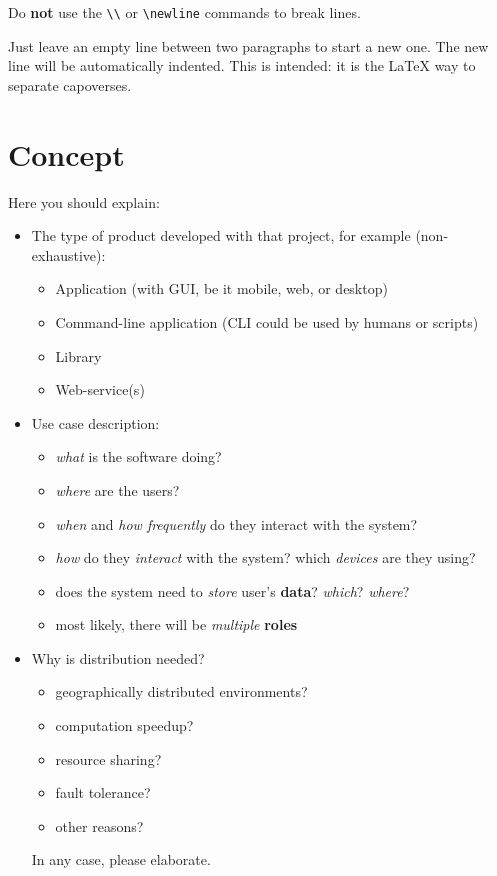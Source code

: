 \documentclass{scrartcl}
\newenvironment{guideline}[1][gray]{\color{#1}}{}
\begin{document}
Do \textbf{not} use the \texttt{\textbackslash\textbackslash} or \texttt{\textbackslash newline} commands to break lines.

Just leave an empty line between two paragraphs to start a new one.
%
The new line will be automatically indented.
%
This is intended: it is the \LaTeX{} way to separate capoverses.

\section{Concept}\label{concept}

\begin{guideline}
Here you should explain:

\begin{itemize}
  \item The type of product developed with that project, for example (non-exhaustive):
  \begin{itemize}
    \item Application (with GUI, be it mobile, web, or desktop)
    \item Command-line application (CLI could be used by humans or scripts)
    \item Library
    \item Web-service(s)
  \end{itemize}

  \item Use case description:
  \begin{itemize}
    \item \emph{what} is the software doing?
    \item \emph{where} are the users?
    \item \emph{when} and \emph{how frequently} do they interact with the system?
    \item \emph{how} do they \emph{interact} with the system? which \emph{devices} are they using?
    \item does the system need to \emph{store} user's \textbf{data}? \emph{which}? \emph{where}?
    \item most likely, there will be \emph{multiple} \textbf{roles}
  \end{itemize}

  \item Why is distribution needed?
  \begin{itemize}
    \item geographically distributed environments?
    \item computation speedup?
    \item resource sharing?
    \item fault tolerance?
    \item other reasons?
  \end{itemize}
  In any case, please elaborate.
\end{itemize}
\end{guideline}
\end{document}
